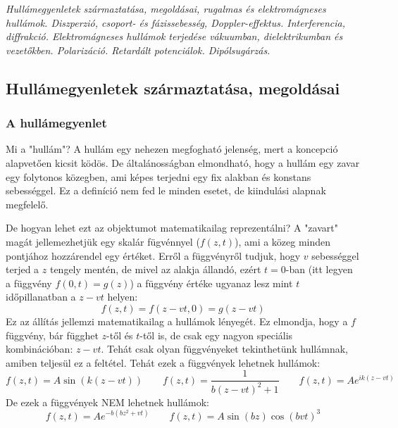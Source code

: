 \documentclass[../main.tex]{subfiles}
\begin{document}
\textit{Hullámegyenletek származtatása, megoldásai, rugalmas és elektromágneses hullámok. Diszperzió, csoport- és fázissebesség, Doppler-effektus.
Interferencia, diffrakció. Elektromágneses hullámok terjedése vákuumban, dielektrikumban és vezetőkben. Polarizáció. Retardált potenciálok. Dipólsugárzás.}

\subsection{Hullámegyenletek származtatása, megoldásai}
\subsubsection{A hullámegyenlet}
Mi a "hullám"? A hullám egy nehezen megfogható jelenség, mert a koncepció alapvetően kicsit ködös. De általánosságban elmondható, hogy a hullám egy zavar egy folytonos közegben,
ami képes terjedni egy fix alakban és konstans sebességgel. Ez a definíció nem fed le minden esetet, de kiindulási alapnak megfelelő.

De hogyan lehet ezt az objektumot matematikailag reprezentálni? A "zavart" magát jellemezhetjük egy skalár fügvénnyel ($f(z, t)$), ami a közeg minden pontjához hozzárendel egy értéket.
Erről a függvényről tudjuk, hogy $v$ sebességgel terjed a $z$ tengely mentén, de mivel az alakja állandó, ezért $t=0$-ban (itt legyen a függvény $f(0, t) = g(z)$) a függvény értéke ugyanaz lesz mint $t$ időpillanatban a $z - vt$ helyen:
\begin{equation}
    f(z, t) = f(z-vt, 0) = g(z - vt)
\end{equation}
Ez az állítás jellemzi matematikailag a hullámok lényegét.  Ez elmondja, hogy a $f$ függvény, bár függhet $z$-től és $t$-től is, de csak egy nagyon speciális kombinációban: $z - vt$.
Tehát csak olyan függvényeket tekinthetünk hullámnak, amiben teljesül ez a feltétel. Tehát ezek a függvények lehetnek hullámok:
\begin{equation}
    f(z, t) = A \sin(k(z - vt)) \qquad f(z, t) = \frac{1}{b(z-vt)^2 + 1} \qquad f(z, t) = A e^{i k (z - vt)}
\end{equation}
De ezek a függvények NEM lehetnek hullámok:
\begin{equation}
    f(z, t) = Ae^{-b(bz^2 + vt)} \qquad f(z, t) = A \sin(bz) \cos(bvt)^3
\end{equation}
\end{document}
